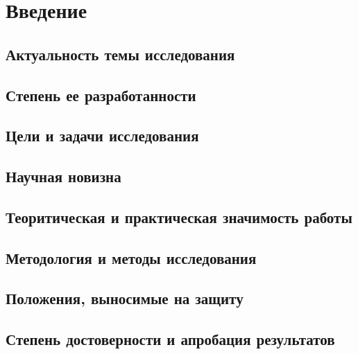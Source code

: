 \chapter{Введение}
\section{Актуальность темы исследования}
\section{Степень ее разработанности}
\section{Цели и задачи исследования}
\section{Научная новизна}
\section{Теоритическая и практическая значимость работы}
\section{Методология и методы исследования}
\section{Положения, выносимые на защиту}
\section{Степень достоверности и апробация результатов}